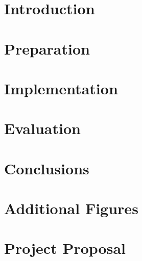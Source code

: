 \documentclass[12pt,a4paper,twoside,openright]{report}
\begin{document}



\chapter{Introduction}


\chapter{Preparation}


\chapter{Implementation}


\chapter{Evaluation}


\chapter{Conclusions}



\newpage

\printbibliography


\appendix


\chapter{Additional Figures}



\newpage

\chapter{Project Proposal}
\label{sec:project-proposal}



\end{document}
